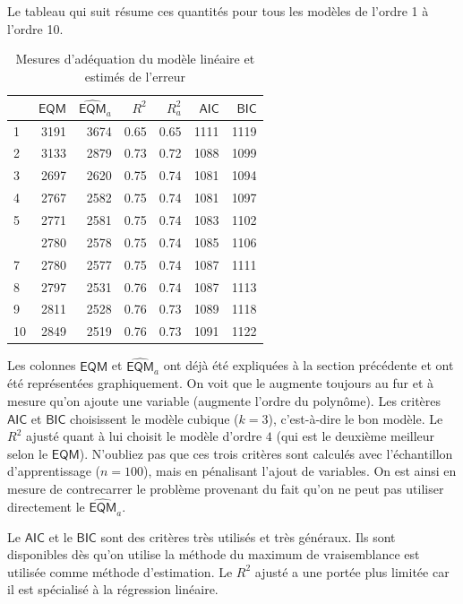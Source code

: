 \documentclass[
  11pt,
  letterpaper,
]{book}
\theoremstyle{definition}
\theoremstyle{definition}
\theoremstyle{definition}
\theoremstyle{definition}
\theoremstyle{remark}
\begin{document}
Le tableau qui suit résume ces quantités pour tous les modèles de l'ordre 1 à l'ordre 10.

\begin{table}

\caption{\label{tab:02-table1}Mesures d'adéquation du modèle linéaire et estimés de l'erreur}
\centering
\begin{tabular}[t]{lrrrrrr}
\toprule
  & \(\mathsf{EQM}\) & \(\widehat{\mathsf{EQM}}_a\) & \(R^2\) & \(R^2_a\) & \(\mathsf{AIC}\) & \(\mathsf{BIC}\)\\
\midrule
1 & 3191 & 3674 & 0.65 & 0.65 & 1111 & 1119\\
2 & 3133 & 2879 & 0.73 & 0.72 & 1088 & 1099\\
3 & 2697 & 2620 & 0.75 & 0.74 & 1081 & 1094\\
4 & 2767 & 2582 & 0.75 & 0.74 & 1081 & 1097\\
5 & 2771 & 2581 & 0.75 & 0.74 & 1083 & 1102\\
\addlinespace
6 & 2780 & 2578 & 0.75 & 0.74 & 1085 & 1106\\
7 & 2780 & 2577 & 0.75 & 0.74 & 1087 & 1111\\
8 & 2797 & 2531 & 0.76 & 0.74 & 1087 & 1113\\
9 & 2811 & 2528 & 0.76 & 0.73 & 1089 & 1118\\
10 & 2849 & 2519 & 0.76 & 0.73 & 1091 & 1122\\
\bottomrule
\end{tabular}
\end{table}

Les colonnes \(\mathsf{EQM}\) et \(\widehat{\mathsf{EQM}}_a\) ont déjà été expliquées à la section précédente et ont été représentées graphiquement.
On voit que le augmente toujours au fur et à mesure qu'on ajoute une variable (augmente l'ordre du polynôme). Les critères \(\mathsf{AIC}\) et \(\mathsf{BIC}\) choisissent le modèle cubique (\(k=3\)), c'est-à-dire le bon modèle. Le \(R^2\) ajusté quant à lui choisit le modèle d'ordre \(4\) (qui est le deuxième meilleur selon le \(\mathsf{EQM}\)). N'oubliez pas que ces trois critères sont calculés avec l'échantillon d'apprentissage (\(n=100\)), mais en pénalisant l'ajout de variables. On est ainsi en mesure de contrecarrer le problème provenant du fait qu'on ne peut pas utiliser directement le \(\widehat{\mathsf{EQM}}_a\).

Le \(\mathsf{AIC}\) et le \(\mathsf{BIC}\) sont des critères très utilisés et très généraux. Ils sont disponibles dès qu'on utilise la méthode du maximum de vraisemblance est utilisée comme méthode d'estimation. Le \(R^2\) ajusté a une portée plus limitée car il est spécialisé à la régression linéaire.
\end{document}
